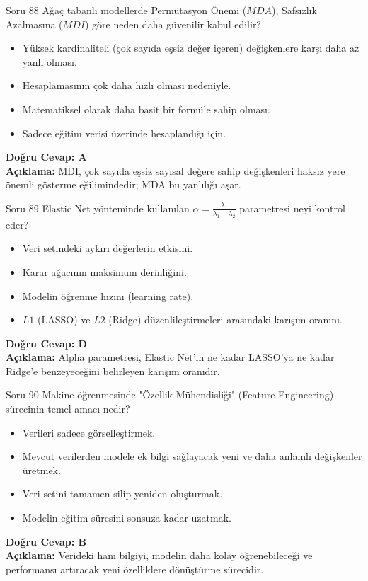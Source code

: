 \documentclass[12pt,a4paper]{article}
\begin{document}
\begin{testcard}{Soru 88}
    Ağaç tabanlı modellerde Permütasyon Önemi ($MDA$), Safsızlık Azalmasına ($MDI$) göre neden daha güvenilir kabul edilir?
    \begin{itemize}
        \item[A)] Yüksek kardinaliteli (çok sayıda eşsiz değer içeren) değişkenlere karşı daha az yanlı olması.
        \item[B)] Hesaplamasının çok daha hızlı olması nedeniyle.
        \item[C)] Matematiksel olarak daha basit bir formüle sahip olması.
        \item[D)] Sadece eğitim verisi üzerinde hesaplandığı için.
    \end{itemize}
    \tcblower
    \textbf{Doğru Cevap: A} \\
    \textbf{Açıklama:} MDI, çok sayıda eşsiz sayısal değere sahip değişkenleri haksız yere önemli gösterme eğilimindedir; MDA bu yanlılığı aşar.
\end{testcard}

\begin{testcard}{Soru 89}
    Elastic Net yönteminde kullanılan $\alpha = \frac{\lambda_1}{\lambda_1 + \lambda_2}$ parametresi neyi kontrol eder?
    \begin{itemize}
        \item[A)] Veri setindeki aykırı değerlerin etkisini.
        \item[B)] Karar ağacının maksimum derinliğini.
        \item[C)] Modelin öğrenme hızını (learning rate).
        \item[D)] $L1$ (LASSO) ve $L2$ (Ridge) düzenlileştirmeleri arasındaki karışım oranını.
    \end{itemize}
    \tcblower
    \textbf{Doğru Cevap: D} \\
    \textbf{Açıklama:} Alpha parametresi, Elastic Net'in ne kadar LASSO'ya ne kadar Ridge'e benzeyeceğini belirleyen karışım oranıdır.
\end{testcard}

\begin{testcard}{Soru 90}
    Makine öğrenmesinde "Özellik Mühendisliği" (Feature Engineering) sürecinin temel amacı nedir?
    \begin{itemize}
        \item[A)] Verileri sadece görselleştirmek.
        \item[B)] Mevcut verilerden modele ek bilgi sağlayacak yeni ve daha anlamlı değişkenler üretmek.
        \item[C)] Veri setini tamamen silip yeniden oluşturmak.
        \item[D)] Modelin eğitim süresini sonsuza kadar uzatmak.
    \end{itemize}
    \tcblower
    \textbf{Doğru Cevap: B} \\
    \textbf{Açıklama:} Verideki ham bilgiyi, modelin daha kolay öğrenebileceği ve performansı artıracak yeni özelliklere dönüştürme sürecidir.
\end{testcard}
\end{document}
